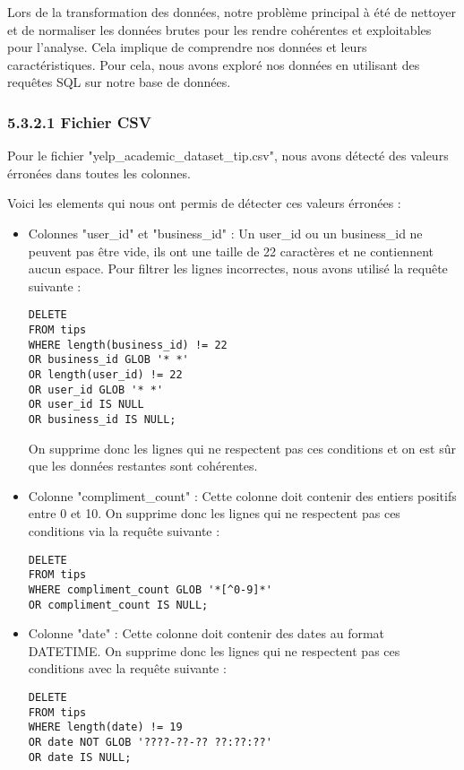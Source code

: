\begin{itemize}
\begin{itemize}
Lors de la transformation des données, notre problème principal à été de nettoyer et de normaliser les données brutes pour les rendre cohérentes et exploitables pour l’analyse.
Cela implique de comprendre nos données et leurs caractéristiques.
Pour cela, nous avons exploré nos données en utilisant des requêtes SQL sur notre base de données.

\subsubsection{5.3.2.1 Fichier CSV}

Pour le fichier "yelp_academic_dataset_tip.csv", nous avons détecté des valeurs érronées dans toutes les colonnes.

Voici les elements qui nous ont permis de détecter ces valeurs érronées :

\begin{itemize}
\item Colonnes "user\_id" et "business\_id" : Un user\_id ou un business\_id ne peuvent pas être vide, ils ont une taille de 22 caractères et ne contiennent aucun espace.
Pour filtrer les lignes incorrectes, nous avons utilisé la requête suivante :

\begin{verbatim}
DELETE
FROM tips
WHERE length(business_id) != 22
OR business_id GLOB '* *'
OR length(user_id) != 22
OR user_id GLOB '* *'
OR user_id IS NULL
OR business_id IS NULL;
\end{verbatim}

On supprime donc les lignes qui ne respectent pas ces conditions et on est sûr que les données restantes sont cohérentes.

\item Colonne "compliment_count" : Cette colonne doit contenir des entiers positifs entre 0 et 10. On supprime donc les lignes qui ne respectent pas ces conditions via la requête suivante :

\begin{verbatim}
DELETE
FROM tips
WHERE compliment_count GLOB '*[^0-9]*'
OR compliment_count IS NULL;
\end{verbatim}

\item Colonne "date" : Cette colonne doit contenir des dates au format DATETIME. On supprime donc les lignes qui ne respectent pas ces conditions avec la requête suivante :

\begin{verbatim}
DELETE
FROM tips
WHERE length(date) != 19
OR date NOT GLOB '????-??-?? ??:??:??'
OR date IS NULL;
\end{verbatim}



\end{itemize}
\end{itemize}
\end{itemize}
